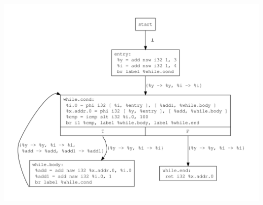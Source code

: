 \documentclass{article}
\theoremstyle{definition}
\begin{document}
\includegraphics[scale=.4]{figures/cse/loop/loop-no-do-cse.pdf}
\end{document}
